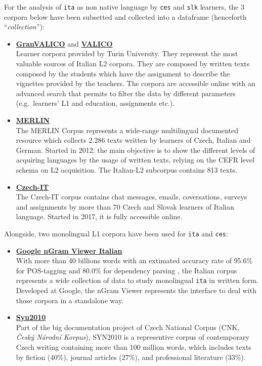 \documentclass[a4paper,twoside,12pt,chapterprefix=false,listof=flat]{scrartcl}
\theoremstyle{plain} %
\theoremstyle{definition}
\theoremstyle{remark}
\begin{document}
For the analysis of \texttt{ita} as non native language by \texttt{ces}
and \texttt{slk} learners, the 3 corpora below have been subsetted and
collected into a dataframe (henceforth \enquote{\emph{collection}}):

\begin{itemize}
\item
  \textbf{\href{http://www.valico.org/valico_b_CORPUS.html}{GranVALICO}}
  and \textbf{\href{http://www.valico.org/valico_CORPUS.html}{VALICO}}
  \citep{valico}\\
  Learner corpora provided by Turin University. They represent the most
  valuable sources of Italian L2 corpora. They are composed by written
  texts composed by the students which have the assignment to describe
  the vignettes provided by the teachers. The corpora are accessible
  online with an advanced search that permits to filter the data by
  different parameters (e.g.~learners' L1 and education, assignments
  etc.).
\item
  \textbf{\href{http://merlin-platform.eu}{MERLIN}} \citep{merlin}\\
  The MERLIN Corpus represents a wide-range multilingual documented
  resource which collects 2.286 texts written by learners of Czech,
  Italian and German. Started in 2012, the main objective is to show the
  different levels of acquiring languages by the usage of written texts,
  relying on the CEFR level schema on L2 acquisition. The Italian-L2
  subcorpus contains 813 texts.
\item
  \textbf{\href{http://czech-it.github.io}{Czech-IT}} \citep{czech-it}\\
  The Czech-IT corpus contains chat messages, emails, coversations,
  surveys and assignments by more than 70 Czech and Slovak learners of
  Italian language. Started in 2017, it is fully accessible online.
\end{itemize}

Alongside, two monolingual L1 corpora have been used for \texttt{ita}
and \texttt{ces}:

\begin{itemize}
\item
  \textbf{\href{http://books.google.com/ngrams}{Google nGram Viewer
  Italian}} \citep{ngram2011}\\
  With more than 40 billions words with an extimated accuracy rate of
  95.6\% for POS-tagging and 80.0\% for dependency parsing
  \citep{ngram2012}, the Italian corpus represents a wide collection of
  data to study monolingual \texttt{ita} in written form. Developed at
  Google, the nGram Viewer represents the interface to deal with those
  corpora in a standalone way.
\item
  \textbf{\href{http://ucnk.korpus.cz/syn2010.php}{Syn2010}}
  \citep{syn2010}\\
  Part of the big documentation project of Czech National Corpus (CNK,
  \emph{Český Národní Korpus}), SYN2010 is a representive corpus of
  contemporary Czech writing containing more than 100 million words,
  which includes texts by fiction (40\%), journal articles (27\%), and
  professional literature (33\%).
\end{itemize}
\end{document}
